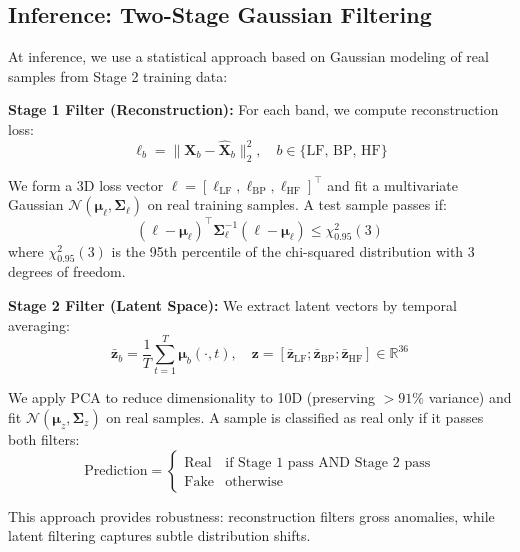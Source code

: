 \documentclass[11pt,twocolumn]{article}
\begin{document}
\subsection{Inference: Two-Stage Gaussian Filtering}

At inference, we use a statistical approach based on Gaussian modeling of real samples from Stage 2 training data:

\textbf{Stage 1 Filter (Reconstruction):} For each band, we compute reconstruction loss:
\begin{equation}
\ell_b = \|\mathbf{X}_b - \hat{\mathbf{X}}_b\|_2^2, \quad b \in \{\text{LF, BP, HF}\}
\end{equation}

We form a 3D loss vector $\mathbf{\ell} = [\ell_{\text{LF}}, \ell_{\text{BP}}, \ell_{\text{HF}}]^\top$ and fit a multivariate Gaussian $\mathcal{N}(\boldsymbol{\mu}_\ell, \boldsymbol{\Sigma}_\ell)$ on real training samples. A test sample passes if:
\begin{equation}
(\mathbf{\ell} - \boldsymbol{\mu}_\ell)^\top \boldsymbol{\Sigma}_\ell^{-1} (\mathbf{\ell} - \boldsymbol{\mu}_\ell) \leq \chi^2_{0.95}(3)
\end{equation}
where $\chi^2_{0.95}(3)$ is the 95th percentile of the chi-squared distribution with 3 degrees of freedom.

\textbf{Stage 2 Filter (Latent Space):} We extract latent vectors by temporal averaging:
\begin{equation}
\bar{\mathbf{z}}_b = \frac{1}{T}\sum_{t=1}^T \boldsymbol{\mu}_b(\cdot, t), \quad \mathbf{z} = [\bar{\mathbf{z}}_{\text{LF}}; \bar{\mathbf{z}}_{\text{BP}}; \bar{\mathbf{z}}_{\text{HF}}] \in \mathbb{R}^{36}
\end{equation}

We apply PCA to reduce dimensionality to 10D (preserving $>91\%$ variance) and fit $\mathcal{N}(\boldsymbol{\mu}_z, \boldsymbol{\Sigma}_z)$ on real samples. A sample is classified as real only if it passes both filters:
\begin{equation}
\text{Prediction} = \begin{cases}
\text{Real} & \text{if Stage 1 pass AND Stage 2 pass} \\
\text{Fake} & \text{otherwise}
\end{cases}
\end{equation}

This approach provides robustness: reconstruction filters gross anomalies, while latent filtering captures subtle distribution shifts.
\end{document}

